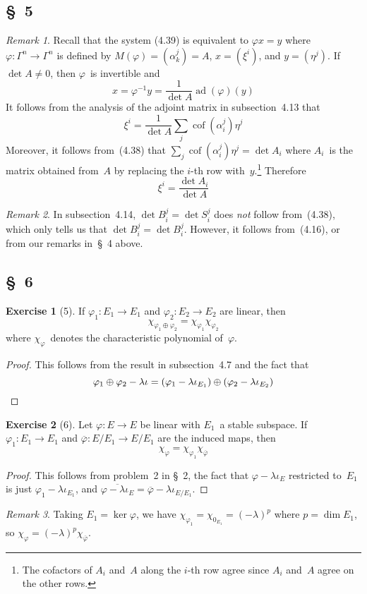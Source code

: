 \documentclass[letterpaper,12pt]{article}
\DeclareMathOperator{\ad}{ad}
\DeclareMathOperator{\cof}{cof}
\newcommand{\dsum}{\oplus}
\newcommand{\proj}[1]{\overline{#1}}
\theoremstyle{definition}
\newtheorem*{exer}{Exercise}
\theoremstyle{remark}
\newtheorem*{rmk}{Remark}
\begin{document}
\subsection*{\S~5}
\begin{rmk}
Recall that the system (4.39) is equivalent to \(\varphi x=y\) where \(\varphi:\Gamma^n\to\Gamma^n\) is defined by \(M(\varphi)=(\alpha^j_k)=A\), \(x=(\xi^i)\), and \(y=(\eta^j)\). If \(\det A\ne0\), then \(\varphi\)~is invertible and
\[x=\varphi^{-1}y=\frac{1}{\det A}\ad(\varphi)(y)\]
It follows from the analysis of the adjoint matrix in subsection~4.13 that
\[\xi^i=\frac{1}{\det A}\sum_j\cof(\alpha^j_i)\eta^j\]
Moreover, it follows from~(4.38) that \(\sum_j\cof(\alpha^j_i)\eta^j=\det A_i\) where \(A_i\)~is the matrix obtained from~\(A\) by replacing the \(i\)-th row with~\(y\).\footnote{The cofactors of \(A_i\) and~\(A\) along the \(i\)-th row agree since \(A_i\) and~\(A\) agree on the other rows.} Therefore
\[\xi^i=\frac{\det A_i}{\det A}\]
\end{rmk}

\begin{rmk}
In subsection~4.14, \(\det B^j_i=\det S^j_i\) does \emph{not} follow from~(4.38), which only tells us that \(\det B^j_i=\det B^j_i\). However, it follows from~(4.16), or from our remarks in~\S~4 above.
\end{rmk}

\subsection*{\S~6}
\begin{exer}[5]
If \(\varphi_1:E_1\to E_1\) and \(\varphi_2:E_2\to E_2\) are linear, then
\[\chi_{\varphi_1\dsum\varphi_2}=\chi_{\varphi_1}\chi_{\varphi_2}\]
where \(\chi_{\varphi}\)~denotes the characteristic polynomial of~\(\varphi\).
\end{exer}
\begin{proof}
This follows from the result in subsection~4.7 and the fact that
\[\varphi_1\dsum\varphi_2-\lambda\iota=(\varphi_1-\lambda\iota_{E_1})\dsum(\varphi_2-\lambda\iota_{E_2})\qedhere\]
\end{proof}

\begin{exer}[6]
Let \(\varphi:E\to E\) be linear with \(E_1\)~a stable subspace. If \(\varphi_1:E_1\to E_1\) and \(\proj{\varphi}:E/E_1\to E/E_1\) are the induced maps, then
\[\chi_{\varphi}=\chi_{\varphi_1}\chi_{\proj{\varphi}}\]
\end{exer}
\begin{proof}
This follows from problem~2 in \S~2, the fact that \(\varphi-\lambda\iota_E\) restricted to~\(E_1\) is just \(\varphi_1-\lambda\iota_{E_1}\), and \(\proj{\varphi-\lambda\iota_E}=\proj{\varphi}-\lambda\iota_{E/E_1}\).
\end{proof}
\begin{rmk}
Taking \(E_1=\ker\varphi\), we have \(\chi_{\varphi_1}=\chi_{0_{E_1}}=(-\lambda)^p\) where \(p=\dim E_1\), so \(\chi_{\varphi}=(-\lambda)^p\chi_{\proj{\varphi}}\).
\end{rmk}
\end{document}
